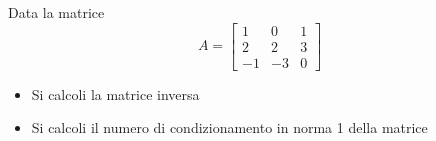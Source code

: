 Data la matrice
\bigskip
\[
A=\left[
\begin{array}{ccc}
1 & 0 & 1 \\
2 & 2 & 3\\
-1 & -3 & 0
\end{array}\right]
\]
\begin{itemize}
\item
Si calcoli la matrice inversa
\item
Si calcoli il numero di condizionamento in norma 1 della matrice
\end{itemize}
